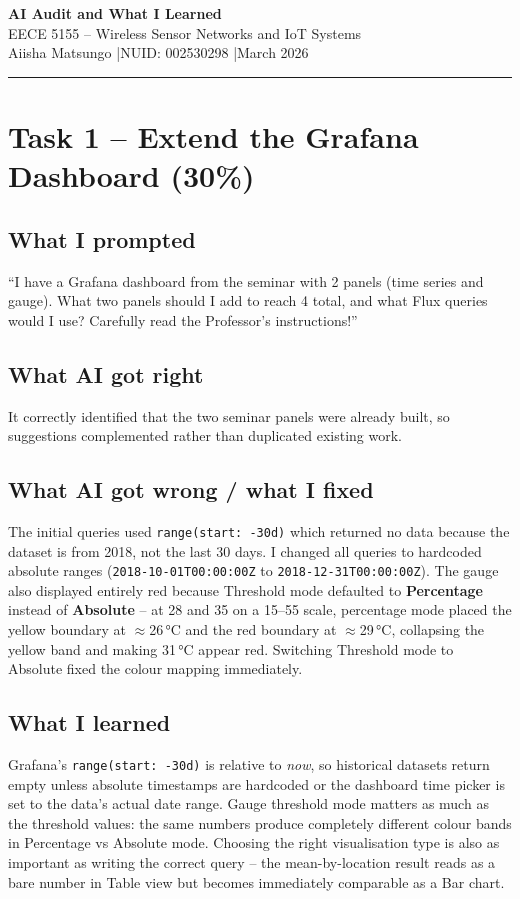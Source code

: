 \documentclass[11pt, letterpaper]{article}
\begin{document}
\begin{center}
  {\LARGE\bfseries AI Audit and What I Learned}\\[6pt]
  {\large EECE 5155 -- Wireless Sensor Networks and IoT Systems}\\[4pt]
  {\normalsize Aiisha Matsungo \quad|\quad NUID: 002530298 \quad|\quad March 2026}
\end{center}
\vspace{4pt}\hrule\vspace{10pt}

\section{Task 1 -- Extend the Grafana Dashboard (30\%)}

\subsection{What I prompted}
``I have a Grafana dashboard from the seminar with 2 panels (time series and gauge).
What two panels should I add to reach 4 total, and what Flux queries would I use? Carefully read the Professor's instructions!''

\subsection{What AI got right}
It correctly identified that the two seminar panels were
already built, so suggestions complemented rather than duplicated existing work.

\subsection{What AI got wrong / what I fixed}
The initial queries used \texttt{range(start: -30d)} which returned no data because
the dataset is from 2018, not the last 30 days. I changed all queries to hardcoded
absolute ranges (\texttt{2018-10-01T00:00:00Z} to \texttt{2018-12-31T00:00:00Z}).
The gauge also displayed entirely red because Threshold mode defaulted to
\textbf{Percentage} instead of \textbf{Absolute} -- at 28 and 35 on a 15--55 scale,
percentage mode placed the yellow boundary at $\approx$26\,°C and the red boundary
at $\approx$29\,°C, collapsing the yellow band and making 31\,°C appear red.
Switching Threshold mode to Absolute fixed the colour mapping immediately.

\subsection{What I learned}
Grafana's \texttt{range(start: -30d)} is relative to \textit{now}, so historical
datasets return empty unless absolute timestamps are hardcoded or the dashboard time
picker is set to the data's actual date range. Gauge threshold mode matters as much
as the threshold values: the same numbers produce completely different colour bands
in Percentage vs Absolute mode. Choosing the right visualisation type is also as
important as writing the correct query -- the mean-by-location result reads as a bare
number in Table view but becomes immediately comparable as a Bar chart.
\end{document}
